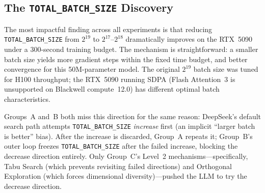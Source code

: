 \subsection{The \texttt{TOTAL\_BATCH\_SIZE} Discovery}

The most impactful finding across all experiments is that reducing
\texttt{TOTAL\_BATCH\_SIZE} from $2^{19}$ to $2^{17}$--$2^{18}$ dramatically
improves \valbpb{} on the RTX~5090 under a 300-second training budget.
The mechanism is straightforward: a smaller batch size yields more gradient
steps within the fixed time budget, and better convergence for this 50M-parameter
model.
The original $2^{19}$ batch size was tuned for H100 throughput; the RTX~5090
running SDPA (Flash Attention~3 is unsupported on Blackwell compute~12.0) has
different optimal batch characteristics.

Groups~A and~B both miss this direction for the same reason: DeepSeek's default
search path attempts \texttt{TOTAL\_BATCH\_SIZE} \emph{increase} first (an
implicit ``larger batch is better'' bias).
After the increase is discarded, Group~A repeats it; Group~B's outer loop
freezes \texttt{TOTAL\_BATCH\_SIZE} after the failed increase, blocking the
decrease direction entirely.
Only Group~C's Level~2 mechanisms---specifically, Tabu Search (which prevents
revisiting failed directions) and Orthogonal Exploration (which forces
dimensional diversity)---pushed the LLM to try the decrease direction.
